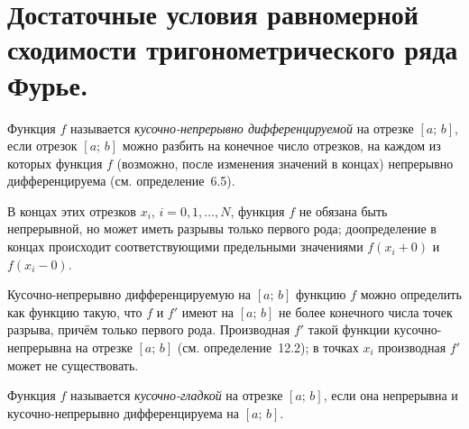 \chapter{Достаточные условия равномерной сходимости тригонометрического ряда Фурье.}

\begin{defn} \label{df22:12}
Функция $f$ называется \textit{кусочно-непрерывно дифференцируемой} на отрезке $[a;\, b]$, если отрезок $[a;\, b]$ можно разбить на конечное число отрезков, на каждом из которых функция $f$ (возможно, после изменения значений в концах) непрерывно дифференцируема (см. определение~6.5).
\end{defn}

\begin{notion}
В концах этих отрезков $x_i$, $i = 0, 1, \ldots, N$, функция $f$ не обязана быть непрерывной, но может иметь разрывы только первого рода; доопределение в концах происходит соответствующими предельными значениями $f(x_i + 0)$ и $f(x_i - 0)$.

Кусочно-непрерывно дифференцируемую на $[a;\, b]$ функцию $f$ можно определить как функцию такую, что $f$ и $f'$ имеют на $[a;\, b]$ не более конечного числа точек разрыва, причём только первого рода. Производная $f'$ такой функции кусочно-непрерывна на отрезке $[a;\, b]$ (см. определение~12.2); в точках $x_i$ производная $f'$ может не существовать.
\end{notion}


\begin{defn} \label{df22:13}
Функция $f$ называется \textit{кусочно-гладкой} на отрезке $[a;\, b]$, если она непрерывна и кусочно-непрерывно дифференцируема на $[a;\, b]$.
\end{defn}


